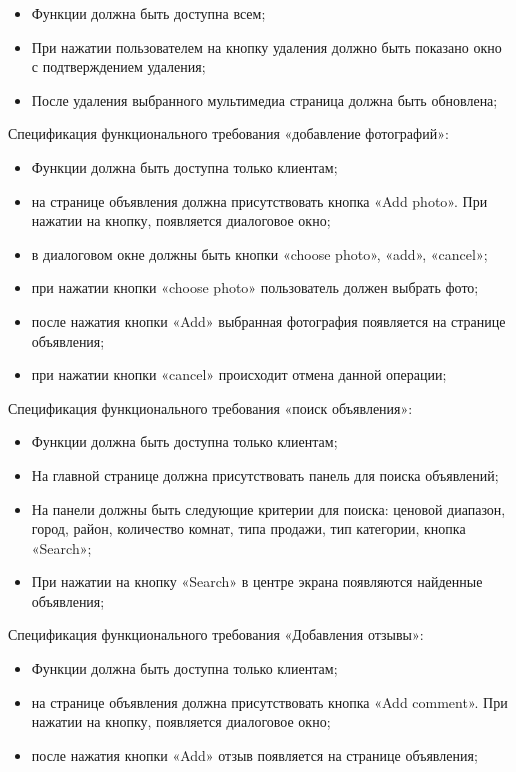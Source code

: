 \begin{itemize}
	\item Функции должна быть доступна всем;
	\item При нажатии пользователем на кнопку удаления должно быть показано окно с подтверждением удаления; 
	\item После удаления выбранного мультимедиа страница должна быть обновлена;
\end{itemize}

Спецификация функционального требования «добавление фотографий»:

\begin{itemize}
	\item Функции должна быть доступна только клиентам;
	\item на странице объявления должна присутствовать кнопка «Add photo». При нажатии на кнопку,  появляется диалоговое окно;
	\item в диалоговом окне должны быть кнопки «choose photo», «add», «cancel»;
	\item при нажатии кнопки «choose photo» пользователь должен выбрать фото;
	\item после нажатия кнопки «Add» выбранная фотография появляется на странице объявления;
	\item при нажатии кнопки «cancel» происходит отмена данной операции;
\end{itemize}

Спецификация функционального требования «поиск объявления»:

\begin{itemize}
	\item Функции должна быть доступна только клиентам;
	\item На главной странице должна присутствовать панель для поиска объявлений;
	\item На панели должны быть следующие критерии для поиска: ценовой диапазон, город, район, количество комнат, типа продажи, тип категории, кнопка «Search»;
	\item При нажатии на кнопку «Search» в центре экрана появляются найденные объявления;
\end{itemize}

Спецификация функционального требования «Добавления отзывы»:

\begin{itemize}
	\item Функции должна быть доступна только клиентам;
	\item на странице объявления должна присутствовать кнопка «Add comment». При нажатии на кнопку, появляется диалоговое окно;
	\item после нажатия кнопки «Add» отзыв появляется на странице объявления;
\end{itemize}

